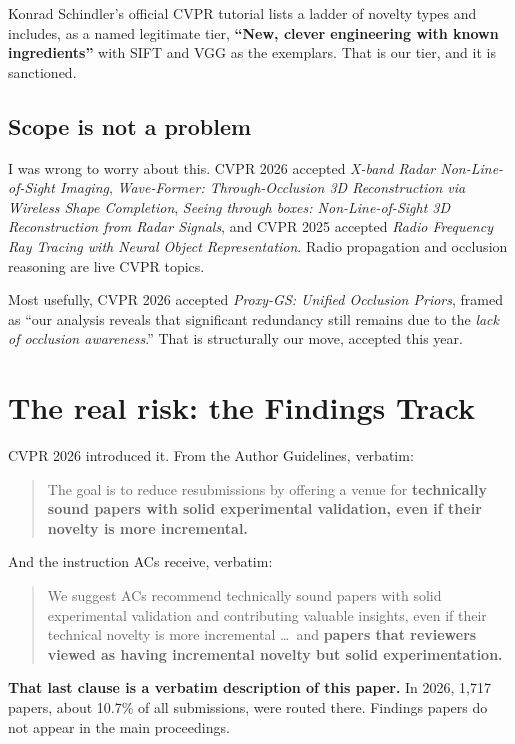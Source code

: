 \documentclass[10pt,a4paper]{article}
\newcommand{\B}[1]{\textcolor{bad}{\textbf{#1}}}
\begin{document}
Konrad Schindler's official CVPR tutorial lists a ladder of novelty types and includes,
as a named legitimate tier, \textbf{``New, clever engineering with known ingredients''}
with SIFT and VGG as the exemplars. That is our tier, and it is sanctioned.

\subsection{Scope is not a problem}

I was wrong to worry about this. CVPR 2026 accepted \emph{X-band Radar Non-Line-of-Sight
Imaging}, \emph{Wave-Former: Through-Occlusion 3D Reconstruction via Wireless Shape
Completion}, \emph{Seeing through boxes: Non-Line-of-Sight 3D Reconstruction from Radar
Signals}, and CVPR 2025 accepted \emph{Radio Frequency Ray Tracing with Neural Object
Representation}. Radio propagation and occlusion reasoning are live CVPR topics.

Most usefully, CVPR 2026 accepted \emph{Proxy-GS: Unified Occlusion Priors}, framed as
``our analysis reveals that significant redundancy still remains due to the \emph{lack of
occlusion awareness}.'' That is structurally our move, accepted this year.

\section{The real risk: the Findings Track}

CVPR 2026 introduced it. From the Author Guidelines, verbatim:

\begin{quote}
The goal is to reduce resubmissions by offering a venue for \textbf{technically sound
papers with solid experimental validation, even if their novelty is more incremental.}
\end{quote}

And the instruction ACs receive, verbatim:

\begin{quote}
We suggest ACs recommend technically sound papers with solid experimental validation and
contributing valuable insights, even if their technical novelty is more incremental
\ldots\ and \textbf{papers that reviewers viewed as having incremental novelty but solid
experimentation.}
\end{quote}

\B{That last clause is a verbatim description of this paper.} In 2026, 1{,}717 papers,
about 10.7\% of all submissions, were routed there. Findings papers do not appear in the
main proceedings.
\end{document}
